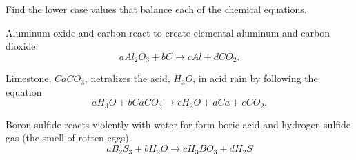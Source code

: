 % 
\begin{lab}
Find the lower case values that balance each of the chemical equations.
\ba
    \item Aluminum oxide and carbon react to create elemental aluminum and carbon dioxide:
        \[ a Al_2O_3 + b C \to c Al + d CO_2. \]
    \item Limestone, $CaCO_3$, netralizes the acid, $H_3O$, in acid rain by following the
        equation
        \[ a H_3O + b CaCO_3 \to c H_2O + d Ca + e CO_2. \]
    \item Boron sulfide reacts violently with water for form boric acid and hydrogen
        sulfide gas (the smell of rotten eggs). 
        \[ a B_2 S_3 + b H_2O \to c H_3 BO_3 + d H_2 S \]
\ea
\end{lab}
